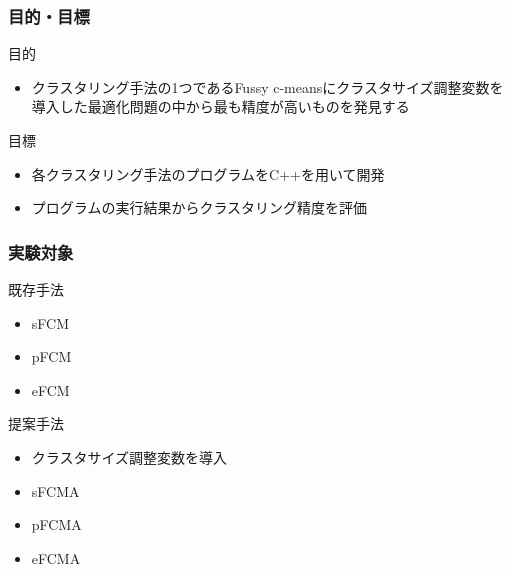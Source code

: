 \documentclass[13pt,dvipdfmx]{beamer}
\begin{document}
\begin{frame}\frametitle{目的・目標}
\begin{block}{目的}
\begin{itemize}
 \item クラスタリング手法の1つであるFussy c-meansにクラスタサイズ調整変数を導入した最適化問題の中から最も精度が高いものを発見する
\end{itemize}
\end{block}
\vspace{4mm}
\begin{block}{目標}
\begin{itemize}
 \item 各クラスタリング手法のプログラムをC++を用いて開発
 \item プログラムの実行結果からクラスタリング精度を評価
\end{itemize}
\end{block}
\end{frame}

\begin{frame}\frametitle{実験対象}
  \begin{block}{既存手法}
   \begin{itemize}
    \item sFCM
    \item pFCM
    \item eFCM
   \end{itemize}
  \end{block}
 \begin{block}{提案手法}
   \begin{itemize}
    \item クラスタサイズ調整変数を導入
    \item sFCMA
    \item pFCMA
    \item eFCMA
   \end{itemize}
 \end{block}
\end{frame}
\end{document}
